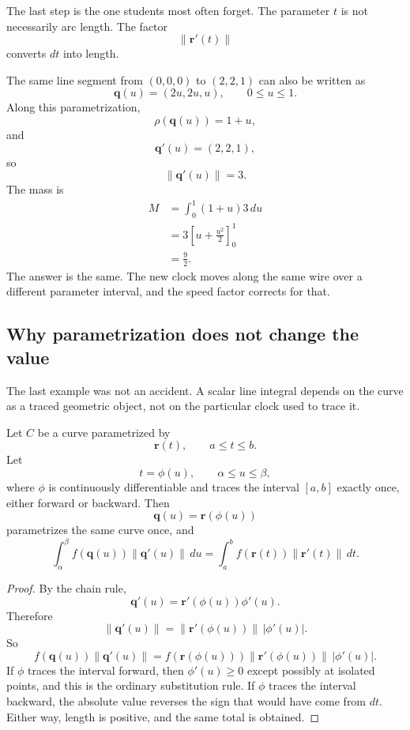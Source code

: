 The last step is the one students most often forget.  The parameter \(t\) is not
necessarily arc length.  The factor
\[
    \|\mathbf r'(t)\|
\]
converts \(dt\) into length.

\begin{example}
The same line segment from \((0,0,0)\) to \((2,2,1)\) can also be written as
\[
    \mathbf q(u)=(2u,2u,u),
    \qquad
    0\le u\le1.
\]
Along this parametrization,
\[
    \rho(\mathbf q(u))=1+u,
\]
and
\[
    \mathbf q'(u)=(2,2,1),
\]
so
\[
    \|\mathbf q'(u)\|=3.
\]
The mass is
\[
\begin{aligned}
M
&=
\int_0^1 (1+u)3\,du\\
&=
3\left[u+\frac{u^2}{2}\right]_0^1\\
&=
\frac92.
\end{aligned}
\]
The answer is the same.  The new clock moves along the same wire over a different
parameter interval, and the speed factor corrects for that.
\end{example}

\subsection{Why parametrization does not change the value}

The last example was not an accident.  A scalar line integral depends on the curve as a
traced geometric object, not on the particular clock used to trace it.

\begin{theorem}
Let \(C\) be a curve parametrized by
\[
    \mathbf r(t),\qquad a\le t\le b.
\]
Let
\[
    t=\phi(u),\qquad \alpha\le u\le \beta,
\]
where \(\phi\) is continuously differentiable and traces the interval \([a,b]\) exactly
once, either forward or backward.  Then
\[
    \mathbf q(u)=\mathbf r(\phi(u))
\]
parametrizes the same curve once, and
\[
\boxed{
    \int_\alpha^\beta
    f(\mathbf q(u))\|\mathbf q'(u)\|\,du
    =
    \int_a^b
    f(\mathbf r(t))\|\mathbf r'(t)\|\,dt.
}
\]
\end{theorem}

\begin{proof}
By the chain rule,
\[
    \mathbf q'(u)=\mathbf r'(\phi(u))\phi'(u).
\]
Therefore
\[
    \|\mathbf q'(u)\|
    =
    \|\mathbf r'(\phi(u))\|\,|\phi'(u)|.
\]
So
\[
    f(\mathbf q(u))\|\mathbf q'(u)\|
    =
    f(\mathbf r(\phi(u)))\|\mathbf r'(\phi(u))\|\,|\phi'(u)|.
\]
If \(\phi\) traces the interval forward, then \(\phi'(u)\ge0\) except possibly at isolated
points, and this is the ordinary substitution rule.  If \(\phi\) traces the interval
backward, the absolute value reverses the sign that would have come from \(dt\).
Either way, length is positive, and the same total is obtained.
\end{proof}

